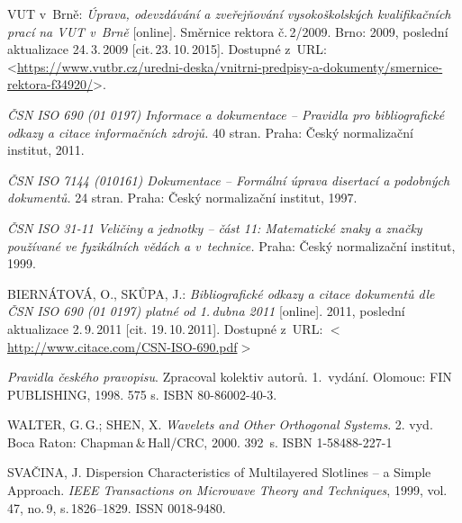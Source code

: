 

\begin{thebibliography}{99}
	
		VUT v~Brně:
    \emph{Úprava, odevzdávání a zveřejňování vysokoškolských kva\-li\-fi\-kač\-ních prací na VUT v~Brně}\/ [online].
		Směrnice rektora č.\,2/2009.
		Brno: 2009, po\-sled\-ní aktualizace 24.\,3.\,2009 [cit.\,23.\,10.\,2015].
    Dostupné z~URL:\\
    <\url{https://www.vutbr.cz/uredni-deska/vnitrni-predpisy-a-dokumenty/smernice-rektora-f34920/}>.

    \emph{ČSN ISO 690 (01 0197) Informace a dokumentace -- Pravidla pro bibliografické odkazy a citace informačních zdrojů.}
    40 stran. Praha: Český normalizační institut, 2011.

    \emph{ČSN ISO 7144 (010161) Dokumentace -- Formální úprava disertací a podobných dokumentů.}
    24 stran. Praha: Český normalizační institut, 1997.

    \emph{ČSN ISO 31-11 Veličiny a jednotky -- část 11: Matematické znaky a značky používané ve fyzikálních vědách a v~technice.}
    Praha: Český normalizační institut, 1999.

    BIERNÁTOVÁ, O., SKŮPA, J.:
    \emph{Bibliografické odkazy a citace dokumentů dle ČSN ISO 690 (01 0197) platné od 1.\,dubna 2011}\/ [online].
    2011, poslední aktualizace 2.\,9.\,2011 [cit. 19.\,10.\,2011].
    Dostupné z~URL:
    \(<\)\url{http://www.citace.com/CSN-ISO-690.pdf}\(>\)

    \emph{Pravidla českého pravopisu}.
    Zpracoval kolektiv autorů. 1.\ vydání.
    Olomouc: FIN PUB\-LISH\-ING, 1998. 575 s. ISBN 80-86002-40-3.

	WALTER, G.\,G.; SHEN, X.
	\emph{Wavelets and Other Orthogonal Systems}.
	2. vyd. Boca Raton: Chapman\,\&\,Hall/CRC, 2000. 392~s. ISBN 1-58488-227-1

	SVAČINA, J.
	Dispersion Characteristics of Multilayered Slotlines -- a Simple Approach.
	\emph{IEEE Transactions on Microwave Theory and Techniques},
	1999, vol.\,47, no.\,9, s.\,1826--1829. ISSN 0018-9480.


\end{thebibliography}
